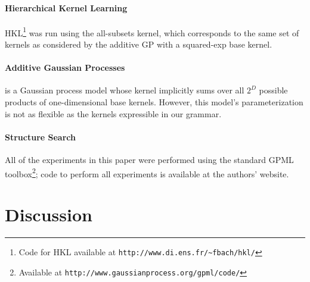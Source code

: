 \documentclass[twoside]{article}
\begin{document}
\paragraph{Hierarchical Kernel Learning}	
HKL\footnote{Code for HKL available at \texttt{http://www.di.ens.fr/\textasciitilde fbach/hkl/}} was run using the all-subsets kernel, which corresponds to the same set of kernels as considered by the additive GP with a squared-exp base kernel.

\paragraph{Additive Gaussian Processes} \cite{duvenaud2011additive11} is a Gaussian process model whose kernel implicitly sums over all $2^D$ possible products of one-dimensional base kernels.  
However, this model's parameterization is not as flexible as the kernels expressible in our grammar.

\paragraph{Structure Search}
All of the experiments in this paper were performed using the standard GPML toolbox\footnote{Available at \texttt{http://www.gaussianprocess.org/gpml/code/}}; code to perform all experiments is available at the authors' website.



\section{Discussion}

\end{document}

